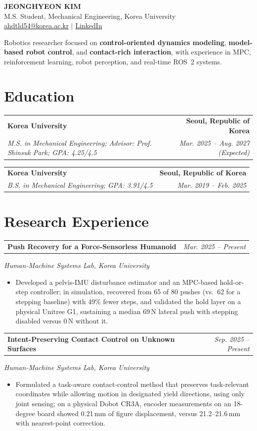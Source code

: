 \documentclass[a4paper,11pt]{article}
\makeatletter
\newcommand{\eduentry}[4]{%
  \begin{tabularx}{\textwidth}{@{}Xr@{}}
    \textbf{#1} & \textbf{#3} \\
    {\small\textit{#2}} & {\small\textit{#4}}
  \end{tabularx}\vspace{0.15ex}
}
\newcommand{\researchentry}[2]{%
  \begin{tabularx}{\textwidth}{@{}Xr@{}}
    \textbf{#1} & \textit{#2}
  \end{tabularx}\vspace{-0.5ex}
}
\newcommand{\compactlist}{%
  \begin{itemize}[leftmargin=1.3em,itemsep=0.12ex,topsep=0.22ex,parsep=0pt,partopsep=0pt]
}
\newcommand{\finishcompactlist}{\end{itemize}\vspace{0.28ex}}
\newcommand{\note}[1]{%
  \par\vspace{0.05ex}{\small #1\par}\vspace{0.3ex}
}
\makeatother
\begin{document}
\begin{center}
  {\LARGE\bfseries JEONGHYEON KIM}\\[0.4ex]
  {\small M.S. Student, Mechanical Engineering, Korea University}\\[0.45ex]
  {\small
    \href{mailto:ahdtld54@korea.ac.kr}{ahdtld54@korea.ac.kr}
    \enspace$\vert$\enspace
    \href{https://www.linkedin.com/in/\%EC\%A0\%95\%ED\%98\%84-\%EA\%B9\%80-b2a0b8263/}{LinkedIn}
  }\\[0.7ex]
  \begin{minipage}{0.95\textwidth}
    \small\centering
    Robotics researcher focused on \textbf{control-oriented dynamics modeling}, \textbf{model-based robot control}, and \textbf{contact-rich interaction}, with experience in MPC, reinforcement learning, robot perception, and real-time ROS~2 systems.
  \end{minipage}
\end{center}
\vspace{-1.0ex}

\section{Education}

\eduentry{Korea University}{M.S. in Mechanical Engineering; Advisor: Prof. Shinsuk Park; GPA: 4.25/4.5}{Seoul, Republic of Korea}{Mar. 2025 -- Aug. 2027 (Expected)}
\note{Funding: Master's Research Encouragement Grant, National Research Foundation of Korea (2025)}
\eduentry{Korea University}{B.S. in Mechanical Engineering; GPA: 3.91/4.5}{Seoul, Republic of Korea}{Mar. 2019 -- Feb. 2025}

\section{Research Experience}

\researchentry{Push Recovery for a Force-Sensorless Humanoid}{Mar. 2025 -- Present}
{\small\textit{Human-Machine Systems Lab, Korea University}}
\compactlist
  \item Developed a pelvis-IMU disturbance estimator and an MPC-based hold-or-step controller; in simulation, recovered from 65 of 80 pushes (vs.\ 62 for a stepping baseline) with 49\% fewer steps, and validated the hold layer on a physical Unitree G1, sustaining a median 69\,N lateral push with stepping disabled versus 0\,N without it.
\finishcompactlist

\researchentry{Intent-Preserving Contact Control on Unknown Surfaces}{Sep. 2025 -- Present}
{\small\textit{Human-Machine Systems Lab, Korea University}}
\compactlist
  \item Formulated a task-aware contact-control method that preserves task-relevant coordinates while allowing motion in designated yield directions, using only joint sensing; on a physical Dobot CR3A, encoder measurements on an 18-degree board showed 0.21\,mm of figure displacement, versus 21.2--21.6\,mm with nearest-point correction.
\finishcompactlist
\end{document}

